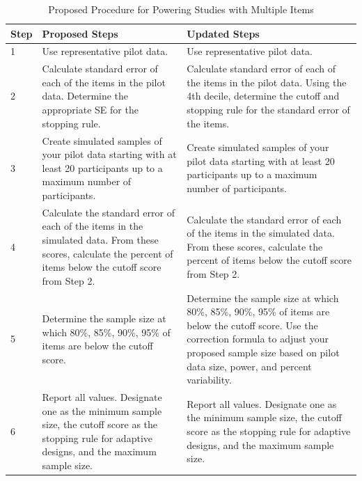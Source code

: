 \documentclass[
  man]{apa7}
\begin{document}
\begin{table}[tbp]

\begin{center}
\begin{threeparttable}

\caption{\label{tab:table-summary}Proposed Procedure for Powering Studies with Multiple Items}

\footnotesize{

\begin{tabular}{m{1cm}m{6cm}m{6cm}}
\toprule
Step & Proposed Steps & Updated Steps\\
\midrule
1 & Use representative pilot data. & Use representative pilot data.\\
2 & Calculate standard error of each of the items in the pilot data. Determine the appropriate SE for the stopping rule. & Calculate standard error of each of the items in the pilot data. Using the 4th decile, determine the cutoff and stopping rule for the standard error of the items.\\
3 & Create simulated samples of your pilot data starting with at least 20 participants up to a maximum number of participants. & Create simulated samples of your pilot data starting with at least 20 participants up to a maximum number of participants.\\
4 & Calculate the standard error of each of the items in the simulated data. From these scores, calculate the percent of items below the cutoff score from Step 2. & Calculate the standard error of each of the items in the simulated data. From these scores, calculate the percent of items below the cutoff score from Step 2.\\
5 & Determine the sample size at which 80\%, 85\%, 90\%, 95\% of items are below the cutoff score. & Determine the sample size at which 80\%, 85\%, 90\%, 95\% of items are below the cutoff score. Use the correction formula to adjust your proposed sample size based on pilot data size, power, and percent variability.\\
6 & Report all values. Designate one as the minimum sample size, the cutoff score as the stopping rule for adaptive designs, and the maximum sample size. & Report all values. Designate one as the minimum sample size, the cutoff score as the stopping rule for adaptive designs, and the maximum sample size.\\
\bottomrule
\end{tabular}

}

\end{threeparttable}
\end{center}

\end{table}
\end{document}
